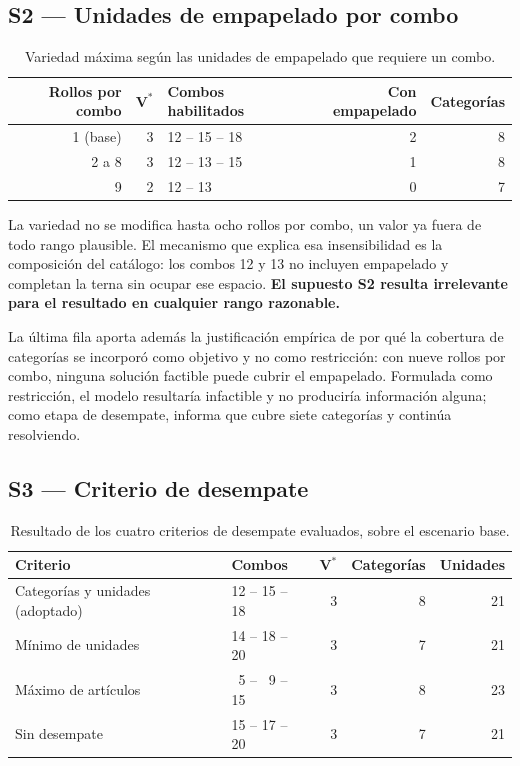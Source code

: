 \documentclass[10pt,a4paper]{article}
\begin{document}
\subsection{S2 — Unidades de empapelado por combo}
\label{sec:sens_s2}

\begin{table}[H]
\centering\small
\caption{Variedad máxima según las unidades de empapelado que requiere un combo.}
\label{tab:sens_s2}
\begin{tabular}{rrlrr}
\toprule
\textbf{Rollos por combo} & $\boldsymbol{V^{*}}$ & \textbf{Combos habilitados} & \textbf{Con empapelado} & \textbf{Categorías} \\
\midrule
1 (base) & 3 & 12 -- 15 -- 18 & 2 & 8 \\
2 a 8    & 3 & 12 -- 13 -- 15 & 1 & 8 \\
9        & 2 & 12 -- 13       & 0 & 7 \\
\bottomrule
\end{tabular}
\end{table}

La variedad no se modifica hasta ocho rollos por combo, un valor ya fuera de
todo rango plausible. El mecanismo que explica esa insensibilidad es la
composición del catálogo: los combos 12 y 13 no incluyen empapelado y completan
la terna sin ocupar ese espacio. \textbf{El supuesto S2 resulta irrelevante para
el resultado en cualquier rango razonable.}

La última fila aporta además la justificación empírica de por qué la cobertura
de categorías se incorporó como objetivo y no como restricción: con nueve rollos
por combo, ninguna solución factible puede cubrir el empapelado. Formulada como
restricción, el modelo resultaría infactible y no produciría información alguna;
como etapa de desempate, informa que cubre siete categorías y continúa
resolviendo.

\subsection{S3 — Criterio de desempate}
\label{sec:sens_s3}

\begin{table}[H]
\centering\small
\caption{Resultado de los cuatro criterios de desempate evaluados, sobre el
escenario base.}
\label{tab:sens_s3}
\begin{tabular}{llrrr}
\toprule
\textbf{Criterio} & \textbf{Combos} & $\boldsymbol{V^{*}}$ & \textbf{Categorías} & \textbf{Unidades} \\
\midrule
Categorías y unidades (adoptado) & 12 -- 15 -- 18 & 3 & 8 & 21 \\
Mínimo de unidades               & 14 -- 18 -- 20 & 3 & 7 & 21 \\
Máximo de artículos              & \ 5 -- \ 9 -- 15 & 3 & 8 & 23 \\
Sin desempate                    & 15 -- 17 -- 20 & 3 & 7 & 21 \\
\bottomrule
\end{tabular}
\end{table}
\end{document}
